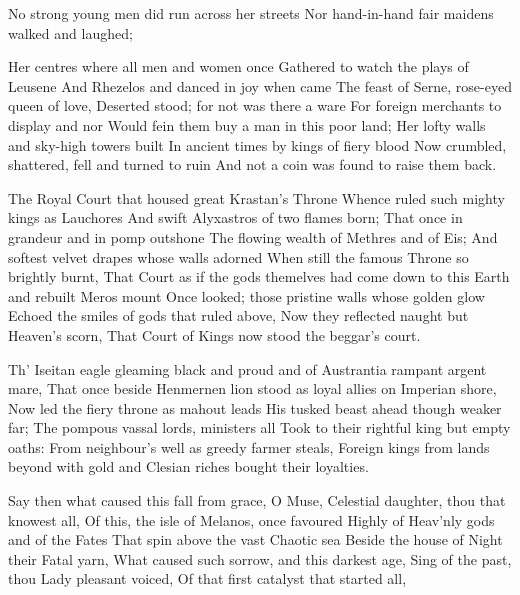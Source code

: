 \documentclass[a4paper,12pt]{article}
\newcommand{\vel}{\verseline}
\begin{document}
\begin{poem}
\begin{stanza}
No strong young men did run across her streets\vel
Nor hand-in-hand fair maidens walked and laughed;
\end{stanza}
\begin{stanza}
Her centres where all men and women once\vel
Gathered to watch the plays of Leusene\vel
And Rhezelos and danced in joy when came\vel
The feast of Serne, rose-eyed queen of love,\vel
Deserted stood; for not was there a ware\vel
For foreign merchants to display and nor\vel
Would fein them buy a man in this poor land;\vel
Her lofty walls and sky-high towers built\vel
In ancient times by kings of fiery blood\vel
Now crumbled, shattered, fell and turned to ruin\vel
And not a coin was found to raise them back.
\end{stanza}
\begin{stanza}
The Royal Court that housed great Krastan's Throne\vel
Whence ruled such mighty kings as Lauchores\vel
And swift Alyxastros of two flames born;\vel
That once in grandeur and in pomp outshone\vel
The flowing wealth of Methres and of Eis;\vel
And softest velvet drapes whose walls adorned\vel
When still the famous Throne so brightly burnt,\vel
That Court as if the gods themelves had come\vel
down to this Earth and rebuilt Meros mount \vel
Once looked; those pristine walls whose golden glow\vel
Echoed the smiles of gods that ruled above,\vel
Now they reflected naught but Heaven's scorn,\vel
That Court of Kings now stood the beggar's court.
\end{stanza}
\begin{stanza}
Th' Iseitan eagle gleaming black and proud\vel
and of Austrantia rampant argent mare,\vel
That once beside Henmernen lion stood\vel
as loyal allies on Imperian shore,\vel
Now led the fiery throne as mahout leads\vel
His tusked beast ahead though weaker far;\vel
The pompous vassal lords, ministers all\vel
Took to their rightful king but empty oaths:\vel
From neighbour's well as greedy farmer steals,\vel
Foreign kings from lands beyond with gold\vel
and Clesian riches bought their loyalties.
\end{stanza}
\begin{stanza}
Say then what caused this fall from grace, O Muse,\vel
Celestial daughter, thou that knowest all,\vel
Of this, the isle of Melanos, once favoured\vel
Highly of Heav'nly gods and of the Fates\vel
That spin above the vast Chaotic sea\vel
Beside the house of Night their Fatal yarn,\vel
What caused such sorrow, and this darkest age,\vel
Sing of the past, thou Lady pleasant voiced,\vel
Of that first catalyst that started all,\vel

\end{stanza}
\end{poem}
\end{document}
